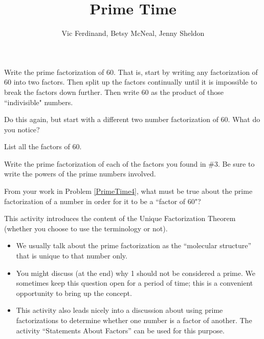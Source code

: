 \documentclass{ximera}
\title{Prime Time}
\author{Vic Ferdinand, Betsy McNeal, Jenny Sheldon}
\begin{document}
\begin{abstract} \end{abstract}
\maketitle



\begin{problem}
 Write the prime factorization of 60.  That is, start by writing any factorization of 60 into two factors.  Then split up the factors continually until it is impossible to break the factors down further.  Then write 60 as the product of those ``indivisible" numbers.
\end{problem} 
\begin{problem}
 Do this again, but start with a different two number factorization of 60.  What do you notice?
\end{problem} 
\begin{problem}
 List all the factors of 60.
\end{problem} 
\begin{problem}\label{PrimeTime4}
 Write the prime factorization of each of the factors you found in $\#$3.  Be sure to write the powers of the prime numbers involved.
\end{problem} 
\begin{problem}
 From your work in Problem \ref{PrimeTime4}, what must be true about the prime factorization of a number in order for it to be a ``factor of 60"? 
\end{problem} 


\newpage
\begin{instructorNotes}
This activity introduces the content of the Unique Factorization Theorem (whether you choose to use the terminology or not). 

\begin{itemize}
	\item We usually talk about the prime factorization as the ``molecular structure'' that is unique to that number only.
	\item You might discuss (at the end) why 1 should not be considered a prime.  We sometimes keep this question open for a period of time; this is a convenient opportunity to bring up the concept.
	\item This activity also leads nicely into a discussion about using prime factorizations to determine whether one number is a factor of another. The activity ``Statements About Factors'' can be used for this purpose.
\end{itemize}

\end{instructorNotes}
\end{document}
